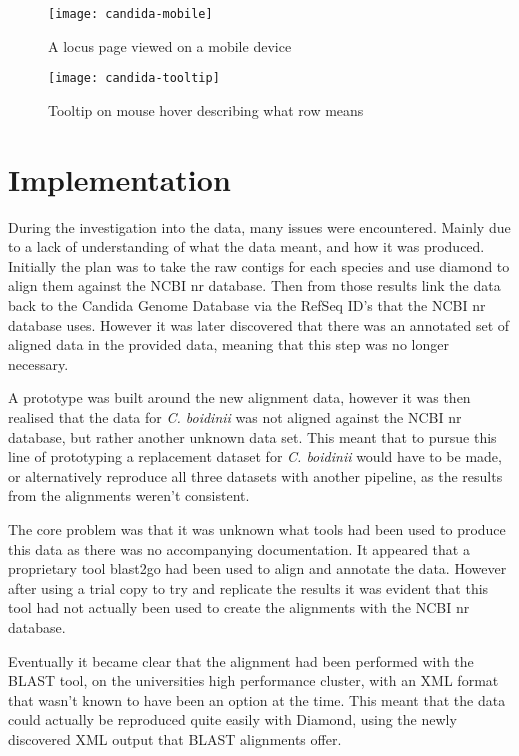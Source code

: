 \begin{figure}[H]
\begin{center}
\texttt{[image: candida-mobile]}
\caption{A locus page viewed on a mobile device}
\end{center}
\end{figure}

\begin{figure}[H]
\begin{center}
\texttt{[image: candida-tooltip]}
\caption{Tooltip on mouse hover describing what row means}
\end{center}
\end{figure}

\section{Implementation}
During the investigation into the data, many issues were encountered. Mainly due to a lack of understanding of what the data meant, and how it was produced. Initially the plan was to take the raw contigs for each species and use diamond to align them against the NCBI nr database. Then from those results link the data back to the Candida Genome Database via the RefSeq ID's that the NCBI nr database uses. However it was later discovered that there was an annotated set of aligned data in the provided data, meaning that this step was no longer necessary.

A prototype was built around the new alignment data, however it was then realised that the data for \textit{C. boidinii} was not aligned against the NCBI nr database, but rather another unknown data set. This meant that to pursue this line of prototyping a replacement dataset for \textit{C. boidinii} would have to be made, or alternatively reproduce all three datasets with another pipeline, as the results from the alignments weren't consistent. 

The core problem was that it was unknown what tools had been used to produce this data as there was no accompanying documentation. It appeared that a proprietary tool blast2go\cite{blast2go} had been used to align and annotate the data. However after using a trial copy to try and replicate the results it was evident that this tool had not actually been used to create the alignments with the NCBI nr database. 

Eventually it became clear that the alignment had been performed with the BLAST tool, on the universities high performance cluster, with an XML format that wasn't known to have been an option at the time. This meant that the data could actually be reproduced quite easily with Diamond, using the newly discovered XML output that BLAST alignments offer.

